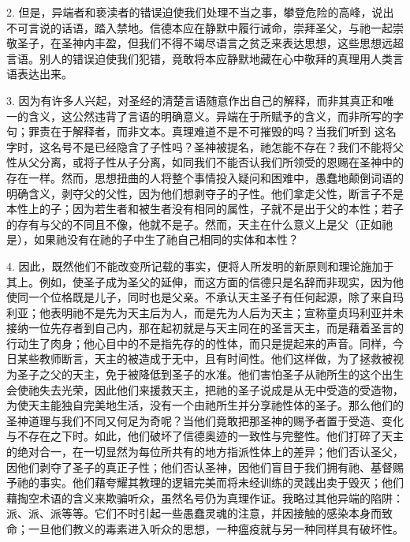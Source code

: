 2. 但是，异端者和亵渎者的错误迫使我们处理不当之事，攀登危险的高峰，说出不可言说的话语，踏入禁地。信德本应在静默中履行诫命，崇拜圣父，与祂一起崇敬圣子，在圣神内丰盈，但我们不得不竭尽语言之贫乏来表达思想，这些思想远超言语。别人的错误迫使我们犯错，竟敢将本应静默地藏在心中敬拜的真理用人类言语表达出来。\par

3. 因为有许多人兴起，对圣经的清楚言语随意作出自己的解释，而非其真正和唯一的含义，这公然违背了言语的明确意义。异端在于所赋予的含义，而非所写的字句；罪责在于解释者，而非文本。真理难道不是不可摧毁的吗？当我们听到  这名字时，这名号不是已经隐含了子性吗？圣神被提名，祂怎能不存在？我们不能将父性从父分离，或将子性从子分离，如同我们不能否认我们所领受的恩赐在圣神中的存在一样。然而，思想扭曲的人将整个事情投入疑问和困难中，愚蠢地颠倒词语的明确含义，剥夺父的父性，因为他们想剥夺子的子性。他们拿走父性，断言子不是本性上的子；因为若生者和被生者没有相同的属性，子就不是出于父的本性；若子的存有与父的不同且不像，他就不是子。然而，天主在什么意义上是父（正如祂是），如果祂没有在祂的子中生了祂自己相同的实体和本性？\par

4. 因此，既然他们不能改变所记载的事实，便将人所发明的新原则和理论施加于其上。例如，使圣子成为圣父的延伸，而这方面的信德只是名辞而非现实，因为他使同一个位格既是儿子，同时也是父亲。不承认天主圣子有任何起源，除了来自玛利亚；他表明祂不是先为天主后为人，而是先为人后为天主；宣称童贞玛利亚并未接纳一位先存者到自己内，那在起初就是与天主同在的圣言天主，而是藉着圣言的行动生了肉身；他心目中的不是指先存的的性体，而只是提起来的声音。同样，今日某些教师断言，天主的被造成于无中，且有时间性。他们这样做，为了拯救被视为圣子之父的天主，免于被降低到圣子的水准。他们害怕圣子从祂所生的这个出生会使祂失去光荣，因此他们来援救天主，把祂的圣子说成是从无中受造的受造物，为使天主能独自完美地生活，没有一个由祂所生并分享祂性体的圣子。那么他们的圣神道理与我们不同又何足为奇呢？当他们竟敢把那圣神的赐予者置于受造、变化与不存在之下时。如此，他们破坏了信德奥迹的一致性与完整性。他们打碎了天主的绝对合一，在一切显然为每位所共有的地方指派性体上的差异；他们否认圣父，因他们剥夺了圣子的真正子性；他们否认圣神，因他们盲目于我们拥有祂、基督赐予祂的事实。他们藉夸耀其教理的逻辑完美而将未经训练的灵践出卖于毁灭；他们藉掏空术语的含义来欺骗听众，虽然名号仍为真理作证。我略过其他异端的陷阱：派、派、派等等。它们不时引起一些愚蠢灵魂的注意，并因接触的感染本身而致命；一旦他们教义的毒素进入听众的思想，一种瘟疫就与另一种同样具有破坏性。\par


